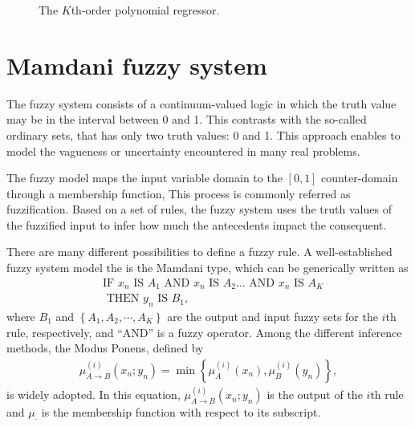 \documentclass[english]{sobraep}
\begin{document}
\begin{figure}[htp]
    
    \caption{The \(K\)th-order polynomial regressor.}
    \label{fig:kth-order-poly}
\end{figure}

\section{Mamdani fuzzy system}

The fuzzy system consists of a continuum-valued logic in which the truth value may be in the interval between 0 and 1. This contrasts with the so-called ordinary sets, that has only two truth values: 0 and 1. This approach enables to model the vagueness or uncertainty encountered in many real problems.

The fuzzy model maps the input variable domain to the \(\left[ 0,1 \right]\) counter-domain through a membership function, This process is commonly referred as fuzzification. Based on a set of rules, the fuzzy system uses the truth values of the fuzzified input to infer how much the antecedents impact the consequent.

There are many different possibilities to define a fuzzy rule. A well-established fuzzy system model the is the Mamdani type, which can be generically written as
\begin{align}
    &\text{IF } x_n \text{ IS } A_1 \text{ AND } x_n \text{ IS } A_2 ... \text{ AND } x_n \text{ IS } A_K \nonumber \\
    &\text{ THEN } y_n \text{ IS } B_1, \nonumber
\end{align}
where \(B_1\) and \(\left\{ A_1, A_2, \cdots, A_K \right\}\) are the output and input fuzzy sets for the \(i\)th rule, respectively, and ``AND'' is a fuzzy operator. Among the different inference methods, the Modus Ponens, defined by
\begin{align}
    \mu_{A\rightarrow B}^{(i)} (x_n;y_n) = \min\left\{  \mu_A^{(i)}(x_n), \mu_B^{(i)} (y_n) \right\},
\end{align}
is widely adopted. In this equation, \(\mu_{A\rightarrow B}^{(i)} (x_n;y_n)\) is the output of the \(i\)th rule and \(\mu_\cdot\) is the membership function with respect to its subscript.
\end{document}
